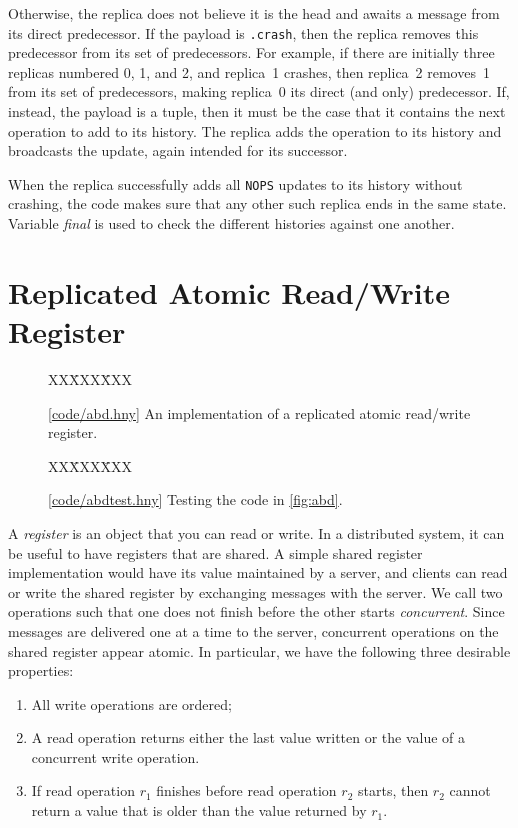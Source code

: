 \documentclass{report}
\newcommand{\harmonysource}[1]{
\begin{tabbing}
XX\=XXX\=XXX\kill
    
\end{tabbing}
}
\newcommand{\harmonylink}[1]{%
[\href{https://harmony.cs.cornell.edu/#1}{\underline{#1}}]%
}
\newenvironment{code}{
\tcolorbox
}{
\endtcolorbox
}
\begin{document}
Otherwise, the replica does not believe it is the head and
awaits a message from its direct predecessor.
If the payload is \texttt{.crash}, then the replica removes this
predecessor from its set of predecessors.  For example, if there
are initially three replicas numbered 0, 1, and 2, and replica~1
crashes, then replica~2 removes~1 from its set of predecessors, making
replica~0 its direct (and only) predecessor.  If, instead, the payload
is a tuple, then it must be the case that it contains the next operation
to add to its history.  The replica adds the operation to its history
and broadcasts the update, again intended for its successor.

When the replica successfully adds all \texttt{NOPS} updates to its
history without crashing, the code makes sure that any other such replica
ends in the same state.  Variable \textit{final} is used to check the
different histories against one another.

\chapter{Replicated Atomic Read/Write Register}
\label{ch:abd}

\begin{figure}
\begin{code}
\harmonysource{abd}
\end{code}
\caption{\harmonylink{code/abd.hny} An implementation of a replicated atomic read/write register.}
\label{fig:abd}
\end{figure}

\begin{figure}
\begin{code}
\harmonysource{abdtest}
\end{code}
\caption{\harmonylink{code/abdtest.hny} Testing the code in \autoref{fig:abd}.}
\label{fig:abdtest}
\end{figure}

A \emph{register} is an object that you can read or write.  In a distributed
system, it can be useful to have registers that are shared.
A simple shared register implementation
would have its value maintained by a server, and clients can read or write the
shared register by exchanging messages with the server.
We call two operations such that one does not finish before the other starts
\emph{concurrent}.
Since messages are delivered one at a time to the server,
concurrent operations on the shared register appear atomic.
In particular, we have the following three desirable properties:
\begin{enumerate}
\item All write operations are ordered;
\item A read operation returns either the last value written or the value of
a concurrent write operation.
\item If read operation $r_1$ finishes before read operation $r_2$ starts,
then $r_2$ cannot return a value that is older than the value returned
by $r_1$.
\end{enumerate}
\end{document}
